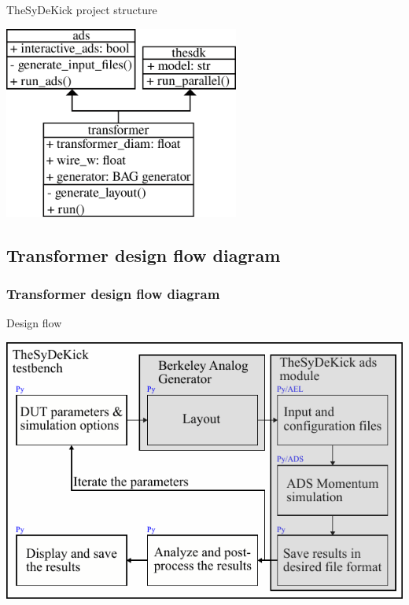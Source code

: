 \documentclass{sdkslides}
\begin{document}
\begin{frame}[c]
\begin{minipage}[t]{0.48\textwidth}
\begin{block}{TheSyDeKick project structure}
\begin{center}
                \includegraphics[width=0.58\textwidth]{./Pics/sdk_structure_v3}
            \end{center}
        \end{block}
    \end{minipage}
\end{frame}
\renewcommand{\sectionname}{Transformer design flow diagram}
\subsection*{\sectionname}
\begin{frame}[c]
    \frametitle{\sectionname}
    \begin{block}{Design flow}
        \begin{center}
            \includegraphics[width=0.8\linewidth]{./Pics/inductor_flow_diagram.pdf}
        \end{center}
    \end{block}
\end{frame}
\renewcommand{\sectionname}{Transformer structures}
\end{document}

